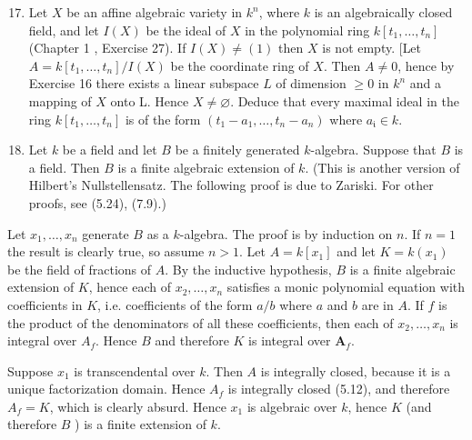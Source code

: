 \documentclass{standalone}
\theoremstyle{definition}
\theoremstyle{remark}
\begin{document}
\begin{enumerate}
  \setcounter{enumi}{16}
  \item Let $X$ be an affine algebraic variety in $k^{n}$, where $k$ is an algebraically closed field, and let $I(X)$ be the ideal of $X$ in the polynomial ring $k\left[t_{1}, \ldots, t_{n}\right]$ (Chapter 1 , Exercise 27). If $I(X) \neq(1)$ then $X$ is not empty. [Let $A=k\left[t_{1}, \ldots, t_{n}\right] / I(X)$ be the coordinate ring of $X$. Then $A \neq 0$, hence by Exercise 16 there exists a linear subspace $L$ of dimension $\geqslant 0$ in $k^{n}$ and a mapping of $X$ onto L. Hence $X \neq \varnothing$. Deduce that every maximal ideal in the ring $k\left[t_{1}, \ldots, t_{n}\right]$ is of the form $\left(t_{1}-a_{1}, \ldots, t_{n}-a_{n}\right)$ where $a_{\mathfrak{i}} \in k$.

  \item Let $k$ be a field and let $B$ be a finitely generated $k$-algebra. Suppose that $B$ is a field. Then $B$ is a finite algebraic extension of $k$. (This is another version of Hilbert's Nullstellensatz. The following proof is due to Zariski. For other proofs, see (5.24), (7.9).)

\end{enumerate}

Let $x_{1}, \ldots, x_{n}$ generate $B$ as a $k$-algebra. The proof is by induction on $n$. If $n=1$ the result is clearly true, so assume $n>1$. Let $A=k\left[x_{1}\right]$ and let $K=k\left(x_{1}\right)$ be the field of fractions of $A$. By the inductive hypothesis, $B$ is a finite algebraic extension of $K$, hence each of $x_{2}, \ldots, x_{n}$ satisfies a monic polynomial equation with coefficients in $K$, i.e. coefficients of the form $a / b$ where $a$ and $b$ are in $A$. If $f$ is the product of the denominators of all these coefficients, then each of $x_{2}, \ldots, x_{n}$ is integral over $A_{f}$. Hence $B$ and therefore $K$ is integral over $\boldsymbol{A}_{f}$.

Suppose $x_{1}$ is transcendental over $k$. Then $A$ is integrally closed, because it is a unique factorization domain. Hence $A_{f}$ is integrally closed (5.12), and therefore $A_{f}=K$, which is clearly absurd. Hence $x_{1}$ is algebraic over $k$, hence $K$ (and therefore $B$ ) is a finite extension of $k$.
\end{document}

